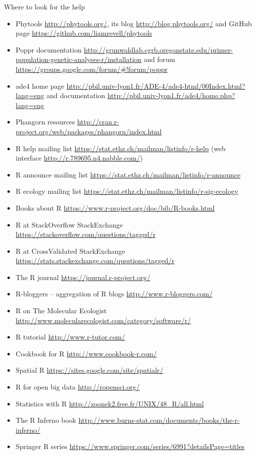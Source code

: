 \documentclass[compress, ucs, xelatex, 11pt, xcolor=svgnames,
  hyperref={
    bookmarks=true,
    unicode=true,
    colorlinks=true,
    pdftitle={Molecular data in R},
    plainpages=false,
    pdfauthor={Vojtech Zeisek},
    pdfsubject={Course about phylogeny and evolution in R},
    pdfcreator={XeLaTeX},
    pdfkeywords={R, evolution, phylogeny, molecular data},
    linkcolor=Tomato,
    anchorcolor=SaddleBrown,
    citecolor=Goldenrod,
    filecolor=DarkMagenta,
    menucolor=Sienna,
    urlcolor=DarkTurquoise,
    pdftex},
  url={hyphens, lowtilde} %
  ]{beamer}
\begin{document}
\begin{frame}[allowframebreaks]{Where to look for the help}
\begin{itemize}
    \item Phytools \url{http://phytools.org/}, its blog \url{http://blog.phytools.org/} and GitHub page \url{https://github.com/liamrevell/phytools}
    \item Poppr documentation \url{http://grunwaldlab.cgrb.oregonstate.edu/primer-population-genetic-analyses-r/installation} and forum \url{https://groups.google.com/forum/\#!forum/poppr}
    \item ade4 home page \url{http://pbil.univ-lyon1.fr/ADE-4/ade4-html/00Index.html?lang=eng} and documentation \url{http://pbil.univ-lyon1.fr/ade4/home.php?lang=eng}
    \item Phangorn resources \url{http://cran.r-project.org/web/packages/phangorn/index.html}
    \item R help mailing list \url{https://stat.ethz.ch/mailman/listinfo/r-help} (web interface \url{http://r.789695.n4.nabble.com/})
    \item R announce mailing list \url{https://stat.ethz.ch/mailman/listinfo/r-announce}
    \item R ecology mailing list \url{https://stat.ethz.ch/mailman/listinfo/r-sig-ecology}
    \item Books about R \url{https://www.r-project.org/doc/bib/R-books.html}
    \item R at StackOverflow StackExchange \url{https://stackoverflow.com/questions/tagged/r}
    \item R at CrossValidated StackExchange \url{https://stats.stackexchange.com/questions/tagged/r}
    \item The R journal \url{https://journal.r-project.org/}
    \item R-bloggers -- aggregation of R blogs \url{http://www.r-bloggers.com/}
    \item R on The Molecular Ecologist \url{http://www.molecularecologist.com/category/software/r/}
    \item R tutorial \url{http://www.r-tutor.com/}
    \item Cookbook for R  \url{http://www.cookbook-r.com/}
    \item Spatial R \url{https://sites.google.com/site/spatialr/}
    \item R for open big data \url{http://ropensci.org/}
    \item Statistics with R \url{http://zoonek2.free.fr/UNIX/48_R/all.html}
    \item The R Inferno book \url{http://www.burns-stat.com/documents/books/the-r-inferno/}
    \item Springer R series \url{https://www.springer.com/series/6991?detailsPage=titles}

\end{itemize}
\end{frame}
\end{document}
